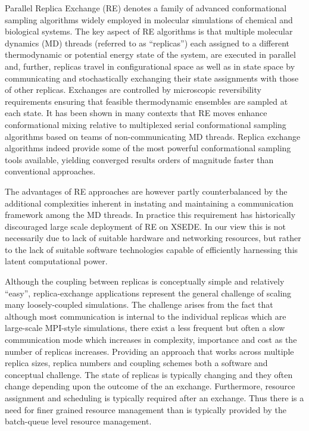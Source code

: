 \documentclass{sig-alternate}
\begin{document}
Parallel Replica Exchange (RE)\cite{hansmann1999new,Felts:Harano:Gallicchio:Levy:2004,Andrec2005,Mitsutake2010} denotes a family of advanced
conformational sampling algorithms widely employed in molecular
simulations of chemical and biological systems. The key aspect of RE
algorithms is that multiple molecular dynamics (MD) threads (referred
to as “replicas”) each assigned to a different thermodynamic or
potential energy state of the system, are executed in parallel and, further,
replicas travel in configurational space as well as in state
space by communicating and stochastically exchanging their state
assignments with those of other replicas. Exchanges are controlled by
microscopic reversibility requirements ensuring that feasible
thermodynamic ensembles are sampled at each state.  It has been shown
in many contexts\cite{Woods2003,Murata2004,Bussi2006,Liu2006,Yeh2008,Meng2010,Gallicchio2011} that RE moves enhance
conformational mixing relative to multiplexed serial conformational
sampling algorithms based on teams of non-communicating
MD threads. Replica exchange algorithms indeed provide some of the
most powerful conformational sampling tools available, yielding
converged results orders of magnitude faster than
conventional approaches.

The advantages of RE approaches are however partly counterbalanced by
the additional complexities inherent in instating and maintaining a
communication framework among the MD threads. In practice this
requirement has historically discouraged large scale deployment of RE
on XSEDE. In our view this is not necessarily due to lack of suitable
hardware and networking resources, but rather to the lack of suitable
software technologies capable of efficiently harnessing this latent
computational power.

Although the coupling between replicas is conceptually simple and
relatively ``easy'', replica-exchange applications represent the
general challenge of scaling many loosely-coupled simulations. The
challenge arises from the fact that although most communication is
internal to the individual replicas which are large-scale MPI-style
simulations, there exist a less frequent but often a slow
communication mode which increases in complexity, importance and cost
as the number of replicas increases. Providing an approach that works
across multiple replica sizes, replica numbers and coupling schemes
both a software and conceptual challenge. The state of replicas is typically changing and they often change
depending upon the outcome of the an exchange. Furthermore, resource
assignment and scheduling is typically required after an exchange.
Thus there is a need for finer grained resource management than is
typically provided by the batch-queue level resource management. 
\end{document}
